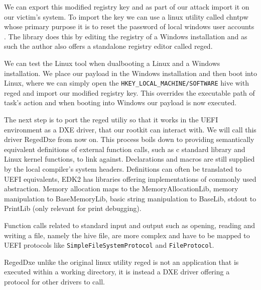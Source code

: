 We can export this modified registry key and as part of our attack import it on our victim's system. To import the key we can use a linux utility called chntpw whose primary purpose it is to reset the password of local windows user accounts \cite{chntpw}. The library does this by editing the registry of a Windows installation and as such the author also offers a standalone registry editor called reged.

We can test the Linux tool when dualbooting a Linux and a Windows installation. We place our payload in the Windows installation and then boot into Linux, where we can simply open the \lstinline{HKEY_LOCAL_MACHINE/SOFTWARE} hive with reged and import our modified registry key.
This overrides the executable path of task's action and when booting into Windows our payload is now executed.


The next step is to port the reged utiliy so that it works in the UEFI environment as a DXE driver, that our rootkit can interact with. We will call this driver RegedDxe from now on.
This process boils down to providing semantically equivalent definitions of external function calls, such as c standard library and Linux kernel functions, to link against. Declarations and macros are still supplied by the local compiler's system headers. Definitions can often be translated to UEFI equivalents, EDK2 has libraries offering implementations of commonly used abstraction.
Memory allocation maps to the MemoryAllocationLib, memory manipulation to BaseMemoryLib, basic string manipulation to BaseLib, stdout to PrintLib (only relevant for print debugging).

Function calls related to standard input and output such as opening, reading and writing a file, namely the hive file, are more complex and have to be mapped to UEFI protocols like \lstinline{SimpleFileSystemProtocol} and \lstinline{FileProtocol}.


RegedDxe unlike the original linux utility reged is not an application that is executed within a working directory, it is instead a DXE driver offering a protocol for other drivers to call.

